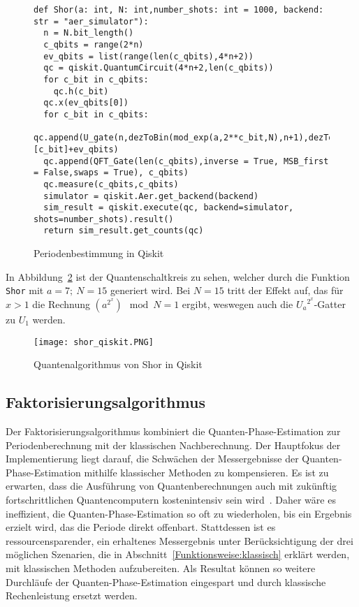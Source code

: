 \begin{figure}[H]
  \caption{Periodenbestimmung in Qiskit}
  \label{code:Periodenbestimmung}
\begin{verbatim}  
def Shor(a: int, N: int,number_shots: int = 1000, backend: str = "aer_simulator"):
  n = N.bit_length()
  c_qbits = range(2*n)
  ev_qbits = list(range(len(c_qbits),4*n+2))
  qc = qiskit.QuantumCircuit(4*n+2,len(c_qbits)) 
  for c_bit in c_qbits:
    qc.h(c_bit)
  qc.x(ev_qbits[0])
  for c_bit in c_qbits:
    qc.append(U_gate(n,dezToBin(mod_exp(a,2**c_bit,N),n+1),dezToBin(N,n+1)),[c_bit]+ev_qbits)
  qc.append(QFT_Gate(len(c_qbits),inverse = True, MSB_first = False,swaps = True), c_qbits)
  qc.measure(c_qbits,c_qbits)
  simulator = qiskit.Aer.get_backend(backend)
  sim_result = qiskit.execute(qc, backend=simulator, shots=number_shots).result()
  return sim_result.get_counts(qc)
  \end{verbatim}
\end{figure}

In Abbildung~\ref{fig:shor_qiskit} ist der Quantenschaltkreis zu sehen, 
welcher durch die Funktion \texttt{Shor} mit \(a=7;~N=15\) generiert wird.
Bei \(N=15\) tritt der Effekt auf, das für \(x>1\) die Rechnung \((a^{2^x})\mod N = 1\) ergibt, 
weswegen auch die \({U_a}^{2^x}\)-Gatter zu \(U_1\) werden.

\begin{figure} [H]
  \caption{Quantenalgorithmus von Shor in Qiskit}
  \label{fig:shor_qiskit}
  \texttt{[image: shor\_qiskit.PNG]}
  \centering
  \end{figure}

\subsection{Faktorisierungsalgorithmus}
Der Faktorisierungsalgorithmus kombiniert die Quanten-Phase-Estimation zur Periodenberechnung mit  
der klassischen Nachberechnung. 
Der Hauptfokus der Implementierung liegt darauf, 
die Schwächen der Messergebnisse der Quanten-Phase-Estimation mithilfe klassischer Methoden zu kompensieren.
Es ist zu erwarten, 
dass die Ausführung von Quantenberechnungen auch mit zukünftig fortschrittlichen Quantencomputern kostenintensiv sein wird~\cite{Shor_1997}.
Daher wäre es ineffizient, 
die Quanten-Phase-Estimation so oft zu wiederholen, 
bis ein Ergebnis erzielt wird, das die Periode direkt offenbart.
Stattdessen ist es ressourcensparender, ein erhaltenes Messergebnis 
unter Berücksichtigung der drei möglichen Szenarien, 
die in Abschnitt~\ref{Funktionsweise:klassisch} erklärt werden,
mit klassischen Methoden aufzubereiten. 
Als Resultat können so weitere Durchläufe der Quanten-Phase-Estimation eingespart und 
durch klassische Rechenleistung ersetzt werden.

